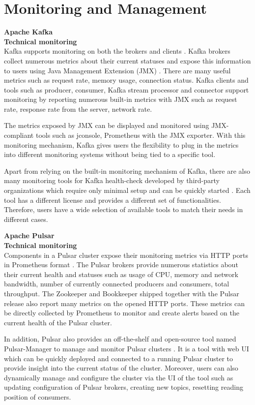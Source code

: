 \section{Monitoring and Management}
\large \textbf{Apache Kafka}\\
\normalsize
\textbf{Technical monitoring}\\
Kafka supports monitoring on both the brokers and clients \cite{kafkamonitoring}. Kafka brokers collect numerous metrics about their current statuses and expose this information to users using Java Management Extension (JMX) \cite{java2006monitoring}. There are many useful metrics such as request rate, memory usage, connection status. Kafka clients and tools such as producer, consumer, Kafka stream processor and connector support monitoring by reporting numerous built-in metrics with JMX such as request rate, response rate from the server, network rate. 

The metrics exposed by JMX can be displayed and monitored using JMX-compliant tools such as jconsole, Prometheus with the JMX exporter. With this monitoring mechanism, Kafka gives users the flexibility to plug in the metrics into different monitoring systems without being tied to a specific tool. 

Apart from relying on the built-in monitoring mechanism of Kafka, there are also many monitoring tools for Kafka health-check developed by third-party organizations which require only minimal setup and can be quickly started \cite{kafkamonitoringtools1}. Each tool has a different license and provides a different set of functionalities. Therefore, users have a wide selection of available tools to match their needs in different cases.

\large \textbf{Apache Pulsar}\\
\normalsize
\textbf{Technical monitoring}\\
Components in a Pulsar cluster expose their monitoring metrics via HTTP ports in Prometheus format \cite{pulsarmetrics}. The Pulsar brokers provide numerous statistics about their current health and statuses such as usage of CPU, memory and network bandwidth, number of currently connected producers and consumers, total throughput. The Zookeeper and Bookkeeper shipped together with the Pulsar release also report many metrics on the opened HTTP ports.
These metrics can be directly collected by Prometheus to monitor and create alerts based on the current health of the Pulsar cluster. 

In addition, Pulsar also provides an off-the-shelf and open-source tool named Pulsar-Manager to manage and monitor Pulsar clusters \cite{pulsarmanager}. It is a tool with web UI which can be quickly deployed and connected to a running Pulsar cluster to provide insight into the current status of the cluster. Moreover, users can also dynamically manage and configure the cluster via the UI of the tool such as updating configuration of Pulsar brokers, creating new topics, resetting reading position of consumers.

